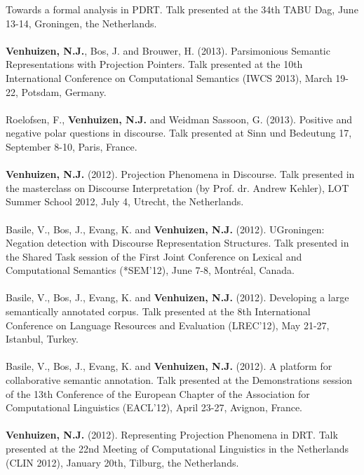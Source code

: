 \documentclass[a4paper,10pt]{article}
\begin{document}
    Towards a formal analysis in PDRT. Talk presented at the 34th TABU Dag,
    June 13-14, Groningen, the Netherlands.\\
    \\
    \textbf{Venhuizen, N.J.}, Bos, J. and Brouwer, H. (2013). Parsimonious 
    Semantic Representations with Projection Pointers. Talk presented at
    the 10th International Conference on Computational Semantics (IWCS 2013),
    March 19-22, Potsdam, Germany.\\
    \\
    Roelofsen, F., \textbf{Venhuizen, N.J.} and Weidman Sassoon, G. (2013).
    Positive and negative polar questions in discourse. Talk presented at
    Sinn und Bedeutung 17, September 8-10, Paris, France.\\
    \\
    \textbf{Venhuizen, N.J.} (2012). Projection Phenomena in Discourse. Talk
    presented in the masterclass on Discourse Interpretation (by Prof. dr.
    Andrew Kehler), LOT Summer School 2012, July 4, Utrecht, the Netherlands.\\
    \\
    Basile, V., Bos, J., Evang, K. and \textbf{Venhuizen, N.J.} (2012).
    UGroningen: Negation detection with Discourse Representation Structures.
    Talk presented in the Shared Task session of the First Joint Conference
    on Lexical and Computational Semantics (*SEM'12), June 7-8, Montr{\'e}al,
    Canada.\\
    \\
    Basile, V., Bos, J., Evang, K. and \textbf{Venhuizen, N.J.} (2012).
    Developing a large semantically annotated corpus. Talk presented at the
    8th International Conference on Language Resources and Evaluation
    (LREC'12), May 21-27, Istanbul, Turkey.\\
    \\
    Basile, V., Bos, J., Evang, K. and \textbf{Venhuizen, N.J.} (2012).
    A platform for collaborative semantic annotation. Talk presented at the
    Demonstrations session of the 13th Conference of the European Chapter of
    the Association for Computational Linguistics (EACL'12), April 23-27,
    Avignon, France.\\
    \\
    \textbf{Venhuizen, N.J.} (2012). Representing Projection Phenomena in
    DRT. Talk presented at the 22nd Meeting of Computational Linguistics in
    the Netherlands (CLIN 2012), January 20th, Tilburg, the Netherlands.
\end{document}
